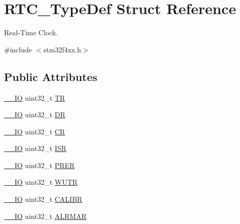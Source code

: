 \hypertarget{struct_r_t_c___type_def}{}\section{R\+T\+C\+\_\+\+Type\+Def Struct Reference}
\label{struct_r_t_c___type_def}


Real-\/\+Time Clock.  




{\ttfamily \#include $<$stm32f4xx.\+h$>$}

\subsection*{Public Attributes}
\begin{DoxyCompactItemize}
\item 
\hyperlink{core__cm4_8h_aec43007d9998a0a0e01faede4133d6be}{\+\_\+\+\_\+\+IO} uint32\+\_\+t \hyperlink{struct_r_t_c___type_def_a2e8783857f8644a4eb80ebc51e1cba42}{TR}
\item 
\hyperlink{core__cm4_8h_aec43007d9998a0a0e01faede4133d6be}{\+\_\+\+\_\+\+IO} uint32\+\_\+t \hyperlink{struct_r_t_c___type_def_a8750eae683cb3d382476dc7cdcd92b96}{DR}
\item 
\hyperlink{core__cm4_8h_aec43007d9998a0a0e01faede4133d6be}{\+\_\+\+\_\+\+IO} uint32\+\_\+t \hyperlink{struct_r_t_c___type_def_a731d9209ce40dce6ea61fcc6f818c892}{CR}
\item 
\hyperlink{core__cm4_8h_aec43007d9998a0a0e01faede4133d6be}{\+\_\+\+\_\+\+IO} uint32\+\_\+t \hyperlink{struct_r_t_c___type_def_a5a7b104d80b48b5708b50cdc487d6a78}{I\+SR}
\item 
\hyperlink{core__cm4_8h_aec43007d9998a0a0e01faede4133d6be}{\+\_\+\+\_\+\+IO} uint32\+\_\+t \hyperlink{struct_r_t_c___type_def_a5f43a11e0873212f598e41db5f2dcf6a}{P\+R\+ER}
\item 
\hyperlink{core__cm4_8h_aec43007d9998a0a0e01faede4133d6be}{\+\_\+\+\_\+\+IO} uint32\+\_\+t \hyperlink{struct_r_t_c___type_def_ad93017bb0a778a2aad9cd71211fc770a}{W\+U\+TR}
\item 
\hyperlink{core__cm4_8h_aec43007d9998a0a0e01faede4133d6be}{\+\_\+\+\_\+\+IO} uint32\+\_\+t \hyperlink{struct_r_t_c___type_def_a2403d29b2bfffb734ebef6642c0d2724}{C\+A\+L\+I\+BR}
\item 
\hyperlink{core__cm4_8h_aec43007d9998a0a0e01faede4133d6be}{\+\_\+\+\_\+\+IO} uint32\+\_\+t \hyperlink{struct_r_t_c___type_def_ad7e54d5c5a4b9fd1e26aca85b1e36c7f}{A\+L\+R\+M\+AR}
\item 

\end{DoxyCompactItemize}
